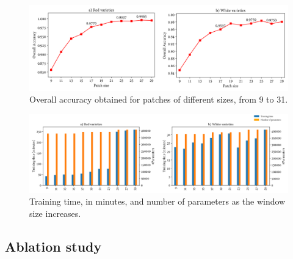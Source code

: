 \begin{figure}[htb]
    \centering
    \includegraphics[width=\linewidth]{figs/vineyard_classification/window_size_test.png}
	\caption{Overall accuracy obtained for patches of different sizes, from 9 to 31. }
	\label{fig:window_size_test}
\end{figure}

\begin{figure}[htb]
    \centering
    \includegraphics[width=\linewidth]{figs/vineyard_classification/time_capacity.png}
	\caption{Training time, in minutes, and number of parameters as the window size increases. }
	\label{fig:time_capacity_test}
\end{figure}

\subsection{Ablation study}

